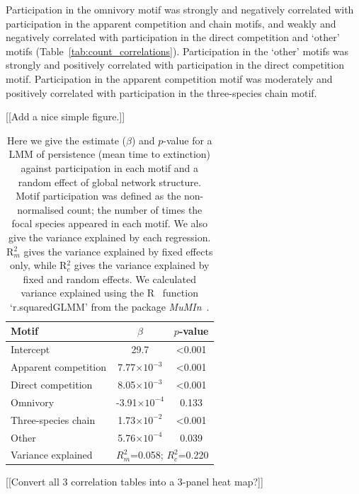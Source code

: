 \documentclass[12pt]{article}
\begin{document}
\begin{spacing}{2.0}
		Participation in the omnivory motif was strongly and negatively correlated with participation in the apparent competition and chain motifs, and weakly and negatively correlated with participation in the direct competition and `other' motifs (Table~\ref{tab:count_correlations}).
		Participation in the `other' motifs was strongly and positively correlated with participation in the direct competition motif.
		Participation in the apparent competition motif was moderately and positively correlated with participation in the three-species chain motif.


		[[Add a nice simple figure.]]


		\begin{table}[h!]
		\caption{Here we give the estimate ($\beta$) and $p$-value for a LMM of persistence (mean time to extinction) against participation in each motif and a random effect of global network structure. Motif participation was defined as the non-normalised count; the number of times the focal species appeared in each motif. We also give the variance explained by each regression. R$^{2}_{m}$ gives the variance explained by fixed effects only, while R$^{2}_{c}$ gives the variance explained by fixed and random effects. We calculated variance explained using the R~\citep{R} function `r.squaredGLMM' from the package \emph{MuMIn}~\citep{MuMIn}.}
		\label{tab:persistence_motifs}
		\begin{tabular}{l | c c}
		 Motif & $\beta$ & $p$-value \\  
		 \hline
		 Intercept & 29.7 & \textless0.001 \\
		 \hline
		 Apparent competition & 7.77$\times10^{-3}$ & \textless0.001 \\
		 Direct competition & 8.05$\times10^{-3}$ & \textless0.001 \\
		 Omnivory &  -3.91$\times10^{-4}$ & 0.133 \\
		 Three-species chain &  1.73$\times10^{-2}$ & \textless0.001 \\
		 Other &  5.76$\times10^{-4}$ & 0.039 \\
		 \hline
		 Variance explained & \multicolumn{2}{c}{$R^{2}_m$=0.058; $R^2_c$=0.220} \\

		 \hline
		 \end{tabular}
		 \end{table}


		[[Convert all 3 correlation tables into a 3-panel heat map?]]



\end{spacing}
\end{document}
